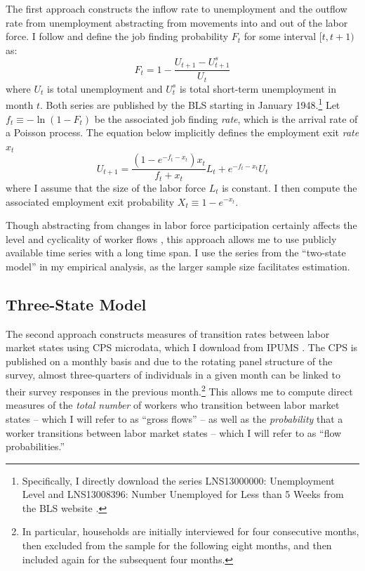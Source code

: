 \documentclass[12pt]{article}
\begin{document}
The first approach constructs the inflow rate to unemployment and the outflow rate from unemployment abstracting from movements into and out of the labor force. I follow \cite{Shimer:2012aa} and define the job finding probability $F_t$ for some interval $[t,t+1)$ as:
\begin{equation}\label{eqn:Ft}
F_t = 1 - \frac{U_{t+1} - U^s_{t+1}}{U_t}
\end{equation}
where $U_t$ is total unemployment and $U^s_t$ is total short-term unemployment in month $t$. Both series are published by the BLS starting in January 1948.\footnote{Specifically, I directly download the series LNS13000000: Unemployment Level and LNS13008396: Number Unemployed for Less than 5 Weeks from the BLS website \citep{BLS:2025aa}.} Let $f_t \equiv - \ln(1 - F_t)$ be the associated job finding \textit{rate}, which is the arrival rate of a Poisson process. The equation below implicitly defines the employment exit \textit{rate} $x_t$
\begin{equation}\label{eqn:xt}
U_{t+1} = \frac{(1 - e^{-f_t-x_t})x_t}{f_t+x_t}L_t + e^{-f_t-x_t}U_t
\end{equation}
where I assume that the size of the labor force $L_t$ is constant. I then compute the associated employment exit probability $X_t \equiv 1 - e^{-x_t}$. 

Though abstracting from changes in labor force participation certainly affects the level and cyclicality of worker flows \citep{Elsby:2015aa}, this approach allows me to use publicly available time series with a long time span. I use the series from the ``two-state model'' in my empirical analysis, as the larger sample size facilitates estimation.

\subsection{Three-State Model}

The second approach constructs measures of transition rates between labor market states using CPS microdata, which I download from IPUMS \citep{Flood:2024aa}. The CPS is published on a monthly basis and due to the rotating panel structure of the survey, almost three-quarters of individuals in a given month can be linked to their survey responses in the previous month.\footnote{In particular, households are initially interviewed for four consecutive months, then excluded from the sample for the following eight months, and then included again for the subsequent four months.} This allows me to compute direct measures of the \textit{total number} of workers who transition between labor market states -- which I will refer to as ``gross flows'' -- as well as the \textit{probability} that a worker transitions between labor market states -- which I will refer to as ``flow probabilities.''
\end{document}
